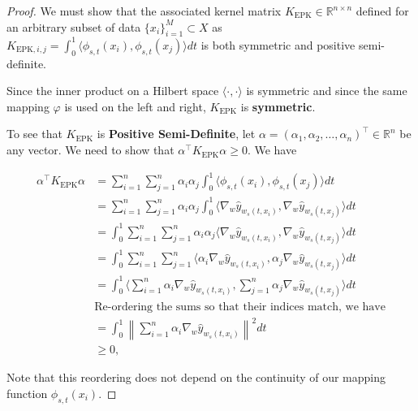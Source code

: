 \ker*
\begin{proof}
We must show that the associated kernel matrix $K_{\text{EPK}} \in \mathbb{R}^{n\times n}$ defined for an arbitrary subset of data $\{x_i\}_{i=1}^M \subset X$ as $K_{\text{EPK},i,j} = \int_0^1\langle \phi_{s,t}(x_i), \phi_{s,t}(x_j)\rangle dt$ is both symmetric and positive semi-definite.

Since the inner product on a Hilbert space $\langle \cdot, \cdot \rangle$ is symmetric and since the same mapping $\varphi$ is used on the left and right, $K_{\text{EPK}}$ is \textbf{symmetric}. 

To see that $K_{\text{EPK}}$ is \textbf{Positive Semi-Definite}, let $\alpha = (\alpha_1, \alpha_2, \dots, \alpha_n)^\top \in \mathbb{R}^n$ be any vector. We need to show that $\alpha^\top K_{\text{EPK}} \alpha \geq 0$. We have

\begin{align}
\alpha^\top K_{\text{EPK}} \alpha &= \sum_{i=1}^n \sum_{j=1}^n \alpha_i \alpha_j \int_0^1 \langle \phi_{s,t}(x_i), \phi_{s,t}(x_j)\rangle dt \\
&= \sum_{i=1}^n \sum_{j=1}^n \alpha_i \alpha_j \int_0^1 \langle \nabla_{w}\hat{y}_{w_s(t,x_i)}, \nabla_{w}\hat{y}_{w_s(t,x_j)}\rangle dt \\
&= \int_0^1 \sum_{i=1}^n \sum_{j=1}^n \alpha_i \alpha_j \langle \nabla_{w}\hat{y}_{w_s(t,x_i)}, \nabla_{w}\hat{y}_{w_s(t,x_j)}\rangle dt \\
&= \int_0^1 \sum_{i=1}^n \sum_{j=1}^n  \langle \alpha_i \nabla_{w}\hat{y}_{w_s(t,x_i)}, \alpha_j \nabla_{w}\hat{y}_{w_s(t,x_j)}\rangle dt \\
&= \int_0^1    \langle \sum_{i=1}^n \alpha_i \nabla_{w}\hat{y}_{w_s(t,x_i)}, \sum_{j=1}^n \alpha_j \nabla_{w}\hat{y}_{w_s(t,x_j)}\rangle dt \\
& \text{Re-ordering the sums so that their indices match, we have}\\
&= \int_0^1 \left\lVert \sum_{i=1}^n \alpha_i \nabla_{w}\hat{y}_{w_s(t,x_i)}\right\rVert^2 dt \\
&\geq 0,
\end{align}

Note that this reordering does not depend on the continuity of our mapping function $\phi_{s,t}(x_i)$.

\end{proof}

